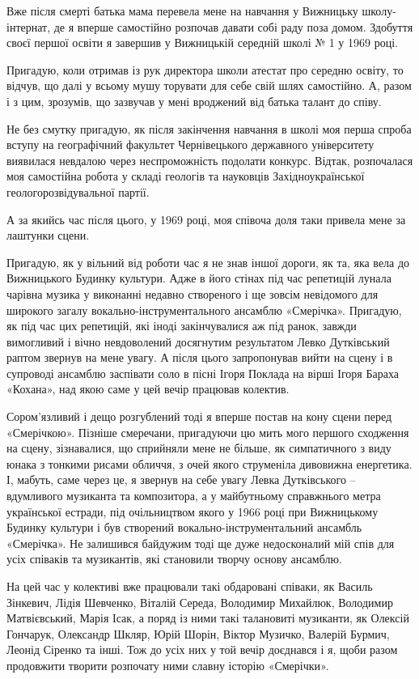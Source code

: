 Вже після смерті батька мама перевела мене на навчання у Вижницьку
школу-інтернат, де я вперше самостійно розпочав давати собі раду поза домом.
Здобуття своєї першої освіти я завершив у Вижницькій середній школі № 1 у 1969
році. 

Пригадую, коли отримав із рук директора школи атестат про середню освіту, то
відчув, що далі у всьому мушу торувати для себе свій шлях самостійно. А, разом
і з цим, зрозумів, що зазвучав у мені вроджений від батька талант до співу.

Не без смутку пригадую, як після закінчення навчання в школі моя перша спроба
вступу на географічний факультет Чернівецького державного університету
виявилася невдалою через неспроможність подолати конкурс. Відтак, розпочалася
моя самостійна робота у складі геологів та науковців Західноукраїнської
геологорозвідувальної партії. 

А за якийсь час після цього, у 1969 році, моя співоча доля таки привела мене за
лаштунки сцени. 

Пригадую, як у вільний від роботи час я не знав іншої дороги, як та, яка вела
до Вижницького Будинку культури. Адже в його стінах під час репетицій лунала
чарівна музика у виконанні недавно створеного і ще зовсім невідомого для
широкого загалу вокально-інструментального ансамблю «Смерічка». Пригадую, як
під час цих репетицій, які іноді закінчувалися аж під ранок, завжди вимогливий
і вічно невдоволений досягнутим результатом Левко Дутківський раптом звернув на
мене увагу. А після цього запропонував вийти на сцену і в супроводі ансамблю
заспівати соло в пісні Ігоря Поклада на вірші Ігоря Бараха «Кохана», над якою
саме у цей вечір працював колектив. 

Сором’язливий і дещо розгублений тоді я вперше постав на кону сцени перед
«Смерічкою». Пізніше смеречани, пригадуючи цю мить мого першого сходження на
сцену, зізнавалися, що сприйняли мене не більше, як симпатичного з виду юнака з
тонкими рисами обличчя, з очей якого струменіла дивовижна енергетика. І,
мабуть, саме через це, я звернув на себе увагу Левка Дутківського – вдумливого
музиканта та композитора, а у майбутньому справжнього метра української
естради, під очільництвом якого у 1966 році при Вижницькому Будинку культури і
був створений вокально-інструментальний ансамбль «Смерічка». Не залишився
байдужим тоді ще дуже недосконалий мій спів для усіх співаків та музикантів,
які становили творчу основу ансамблю. 

На цей час у колективі вже працювали такі обдаровані співаки, як Василь
Зінкевич, Лідія Шевченко, Віталій Середа, Володимир Михайлюк, Володимир
Матвієвський, Марія Ісак, а поряд із ними такі талановиті музиканти, як Олексій
Гончарук, Олександр Шкляр, Юрій Шорін, Віктор Музичко, Валерій Бурмич, Леонід
Сіренко та інші. Тож до усіх них у той вечір доєднався і я, щоби разом
продовжити творити розпочату ними славну історію «Смерічки». 

